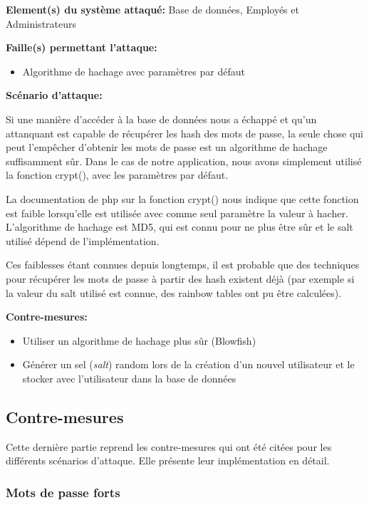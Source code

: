 \documentclass{article}
\begin{document}
\textbf{Element(s) du système attaqué:} Base de données, Employés et
Administrateurs

\textbf{Faille(s) permettant l'attaque:}

\begin{itemize}
\tightlist
\item
  Algorithme de hachage avec paramètres par défaut
\end{itemize}

\textbf{Scénario d'attaque:}

Si une manière d'accéder à la base de données nous a échappé et qu'un
attanquant est capable de récupérer les hash des mots de passe, la seule
chose qui peut l'empêcher d'obtenir les mots de passe est un algorithme
de hachage suffisamment sûr. Dans le cas de notre application, nous
avons simplement utilisé la fonction crypt(), avec les paramètres par
défaut.

La documentation de php sur la fonction crypt() nous indique que cette
fonction est faible lorsqu'elle est utilisée avec comme seul paramètre
la valeur à hacher. L'algorithme de hachage est MD5, qui est connu pour
ne plus être sûr et le salt utilisé dépend de l'implémentation.

Ces faiblesses étant connues depuis longtemps, il est probable que des
techniques pour récupérer les mots de passe à partir des hash existent
déjà (par exemple si la valeur du salt utilisé est connue, des rainbow
tables ont pu être calculées).

\textbf{Contre-mesures:}

\begin{itemize}
\tightlist
\item
  Utiliser un algorithme de hachage plus sûr (Blowfish)
\item
  Générer un sel (\emph{salt}) random lors de la création d'un nouvel
  utilisateur et le stocker avec l'utilisateur dans la base de données
\end{itemize}

\hypertarget{contre-mesures}{%
\subsection{Contre-mesures}\label{contre-mesures}}

Cette dernière partie reprend les contre-mesures qui ont été citées pour
les différents scénarios d'attaque. Elle présente leur implémentation en
détail.

\hypertarget{mots-de-passe-forts}{%
\subsubsection{Mots de passe forts}\label{mots-de-passe-forts}}
\end{document}
